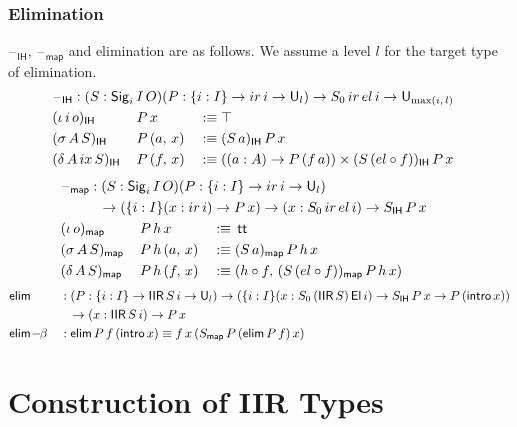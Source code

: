 \documentclass[acmsmall,screen,review,anonymous]{acmart}
\newcommand{\msf}[1]{{\mathsf{#1}}}
\newcommand{\U}{\msf{U}}
\newcommand{\El}{\msf{El}}
\newcommand{\Sig}{\msf{Sig}}
\newcommand{\ttt}{\msf{tt}}
\newcommand{\blank}{{\mathord{\hspace{1pt}\text{--}\hspace{1pt}}}}
\newcommand{\ir}{{ir}}
\newcommand{\el}{{el}}
\newcommand{\ix}{{ix}}
\newcommand{\intro}{\msf{intro}}
\newcommand{\IH}{\msf{IH}}
\newcommand{\map}{\msf{map}}
\newcommand{\elim}{\msf{elim}}
\newcommand{\IIR}{\msf{IIR}}
\begin{document}
\subsubsection{Elimination}\label{sec:iir-elimination} $\blank_\IH$, $\blank_\map$ and elimination are
as follows. We assume a level $l$ for the target type of elimination.
\begin{alignat*}{3}
  &\rlap{$\blank_\IH : (S : \Sig_i\,I\,O)(P : \{i : I\}\to \ir\,i \to \U_l) \to S_0\,\ir\,\el\,i \to \U_{\max(i,\,l)}$} \\
  &(\iota\,i\,o)_\IH \,&&P\,x       &&:\equiv \top \\
  &(\sigma\,A\,S)_\IH\,&&P\,(a,\,x) &&:\equiv (S\,a)_\IH\,P\,x \\
  &(\delta\,A\,\ix\,S)_\IH\,&&P\,(f,\,x) &&:\equiv ((a : A) \to P\,(f\,a)) \times (S\,(\el \circ f))_\IH\,P\,x
\end{alignat*}
\begin{alignat*}{3}
  &\hspace{-3em}\rlap{$\blank_\map : (S : \Sig_i\,I\,O)(P : \{i : I\}\to \ir\,i \to \U_l)$}\\
  &\hspace{-3em}\rlap{$\hspace{3em}\to (\{i : I\}(x : \ir\,i) \to P\,x) \to (x : S_0\,\ir\,\el\,i) \to S_\IH\,P\,x$} \\
  &\hspace{-3em}(\iota\,o)_\map    \,&&P\,h\,x       &&:\equiv\,\ttt \\
  &\hspace{-3em}(\sigma\,A\,S)_\map\,&&P\,h\,(a,\,x) &&:\equiv (S\,a)_\map\,P\,h\,x \\
  &\hspace{-3em}(\delta\,A\,S)_\map\,&&P\,h\,(f,\,x) &&:\equiv (h \circ f,\,(S\,(\el \circ f))_\map\,P\,h\,x)
\end{alignat*}
\begin{alignat*}{3}
  &\elim           &&: (P : \{i : I\}\to \IIR\,S\,i \to \U_l) \to (\{i : I\}(x : S_0\,(\IIR\,S)\,\El\,i) \to S_\IH\,P\,x \to P\,(\intro\,x))\\
  &                && \hspace{0.7em}\to (x : \IIR\,S\,i) \to P\,x \\
  &\elim\!-\!\!\beta &&: \elim\,P\,f\,(\intro\,x) \equiv f\,x\,(S_\map\,P\,(\elim\,P\,f)\,x)
\end{alignat*}

\section{Construction of IIR Types}
\end{document}
